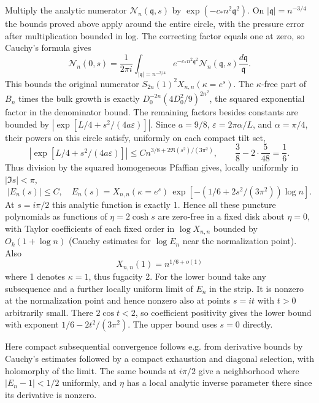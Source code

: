 Multiply the analytic numerator \(\mathcal N_n(\mathfrak q,s)\) by \(\exp(-c_* n^2\mathfrak q^2)\). On \(|\mathfrak q|=n^{-3/4}\) the bounds proved above apply around the entire circle, with the pressure error after multiplication bounded in log. The correcting factor equals one at zero, so Cauchy's formula gives
\[
 \mathcal N_n(0,s)=\frac{1}{2\pi i}
 \int_{|\mathfrak q|=n^{-3/4}}
 e^{-c_*n^2\mathfrak q^2}\mathcal N_n(\mathfrak q,s)
 \frac{d\mathfrak q}{\mathfrak q}.
\]
This bounds the original numerator \(S_{2n}(1)^2X_{n,n}(\kappa=e^s)\). The \(\kappa\)-free part of \(B_n\) times the bulk growth is exactly \(D_0^{-2n}(4D_0^2/9)^{2n^2}\), the squared exponential factor in the denominator bound. The remaining factors besides constants are bounded by \(\left|\exp[L/4+s^2/(4a\varepsilon)]\right|\). Since \(a=9/8\), \(\varepsilon=2\pi\alpha/L\), and \(\alpha=\pi/4\), their powers on this circle satisfy, uniformly on each compact tilt set,
\[
 \left|\exp[L/4+s^2/(4a\varepsilon)]\right|
 \le C n^{3/8+2\Re(s^2)/(3\pi^2)},\qquad
 \frac38-2\cdot\frac5{48}=\frac16.
\]
Thus division by the squared homogeneous Pfaffian gives, locally uniformly in \(|\Im s|<\pi\),
\[
 |E_n(s)|\le C,\quad
 E_n(s)=X_{n,n}(\kappa=e^s)\,\exp[-(1/6+2s^2/(3\pi^2))\log n].
\]
At \(s=i\pi/2\) this analytic function is exactly 1. Hence all these puncture polynomials as functions of \(\eta=2\cosh s\) are zero-free in a fixed disk about \(\eta=0\), with Taylor coefficients of each fixed order in \(\log X_{n,n}\) bounded by \(O_k(1+\log n)\) (Cauchy estimates for \(\log E_n\) near the normalization point). Also
\[
X_{n,n}(1)=n^{1/6+o(1)}
\]
where 1 denotes \(\kappa=1\), thus fugacity 2. For the lower bound take any subsequence and a further locally uniform limit of \(E_n\) in the strip. It is nonzero at the normalization point and hence nonzero also at points \(s=i t\) with \(t>0\) arbitrarily small. There \(2\cos t<2\), so coefficient positivity gives the lower bound with exponent \(1/6-2t^2/(3\pi^2)\). The upper bound uses \(s=0\) directly.

Here compact subsequential convergence follows e.g. from derivative bounds by Cauchy's estimates followed by a compact exhaustion and diagonal selection, with holomorphy of the limit. The same bounds at \(i\pi/2\) give a neighborhood where \(|E_n-1|<1/2\) uniformly, and \(\eta\) has a local analytic inverse parameter there since its derivative is nonzero.
